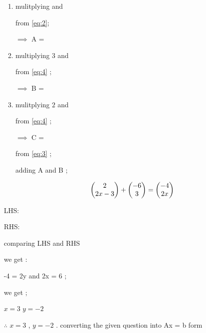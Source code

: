 \documentclass[journal,12pt,twocolumn]{IEEEtran}
\begin{document}
       \begin{enumerate} [label=(\roman*)]
 \item mulitplying 
        and 
      
       from \eqref{eq:2};
      
       $\implies$  A = \  
      
 \item multiplying $3$ and
      
       from \eqref{eq:4} ;
      
       $\implies$  B =  
       
 \item mulitplying 
       $2$ and  

       from \eqref{eq:4} ;
      
       $\implies$  C = 
      
       from \eqref{eq:3} ; 
      
       adding A and B ;
       
       \begin{align}
       \begin{pmatrix}2\\2x-3 \end{pmatrix} + \begin{pmatrix}-6\\3\end{pmatrix} = 
       \begin{pmatrix}-4\\2x\end{pmatrix} 
       \end{align}
       \end{enumerate} 
      \newpage
{LHS}: 
      
{RHS}:              
      
       comparing {LHS} and {RHS}
      
       we get :
      
       -4 = 2y and 2x = 6 ;
      
       we get ;
      
      $x = 3$ $y = -2$ 
      
     $\therefore$ $x = 3$  , $y = -2$ .
      \newpage
      converting the given question into Ax = b form 
\end{document}
